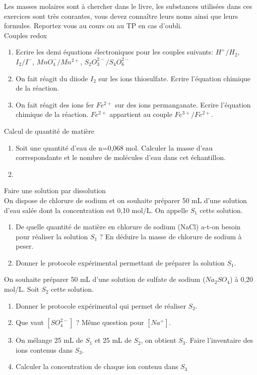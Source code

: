  


Les masses molaires sont à chercher dans le livre, les substances utilisées dans ces exercices sont très courantes, vous devez connaître leurs noms ainsi que leurs formules. Reportez vous au cours ou au TP en cas d'oubli.\\
\exo Couples redox
\begin{enumerate}
\item Ecrire les demi équations électroniques pour les couples suivants: $H^+/H_2$, $I_2/I^-$, $MnO_4^-/Mn^{2+}$, $S_2O_3^{2-}/S_4O_6^{2-}$
\item On fait réagit  du diiode $I_2$ sur les ions thiosulfate. Ecrire l'équation chimique de la réaction.
\item  On fait réagit des ions fer $Fe^{2+}$ sur des ions permanganate. Ecrire l'équation chimique de la réaction. $Fe^{2+}$ appartient au couple $Fe^{3+}/Fe^{2+}$.
\end{enumerate}
\exo Calcul de quantité de matière
\begin{enumerate}
\item Soit une quantité d'eau de n=0,068 mol. Calculer la masse d'eau correspondante et le nombre de molécules d'eau dans cet échantillon.
\item 
\end{enumerate}
\exo Faire une solution par dissolution\\
On dispose de chlorure de sodium et on souhaite préparer  50 mL d'une solution d'eau salée dont la concentration est 0,10 mol/L. On appelle $S_1$ cette solution.
\begin{enumerate}
\item De quelle quantité de matière en chlorure de sodium (NaCl) a-t-on besoin pour réaliser la solution $S_1$ ? En déduire la masse de chlorure de sodium à peser.
\item Donner le protocole expérimental permettant de préparer la solution $S_1$.
\end{enumerate}

On souhaite préparer 50 mL d'une solution de sulfate de sodium ($Na_2SO_4$) à 0,20 mol/L. Soit $S_2$ cette solution.
\begin{enumerate}
\item Donner le protocole expérimental qui permet de réaliser $S_2$.
\item Que vaut $[SO_4^{2-}]$ ? Même question pour $[Na^+]$.
\item On mélange 25 mL de $S_1$ et 25 mL de $S_2$, on obtient $S_3$. Faire l'inventaire des ions contenus dans $S_3$.
\item Calculer la concentration de chaque ion contenu dans $S_3$
\end{enumerate}

